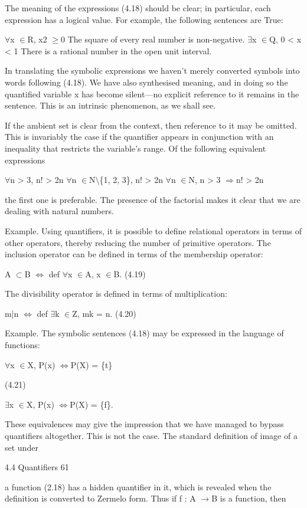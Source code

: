 \documentclass[11pt]{article}
\theoremstyle{plain}
\theoremstyle{definition}
\begin{document}
The meaning of the expressions (4.18) should be clear; in particular, each expression has a logical value. For example, the following sentences are True:

$\forall$x $\in$R, x2 $\geq$0 The square of every real number is non-negative. $\exists$x $\in$Q, 0 < x < 1 There is a rational number in the open unit interval.

In translating the symbolic expressions we haven't merely converted symbols into words following (4.18). We have also synthesised meaning, and in doing so the quantified variable x has become silent---no explicit reference to it remains in the sentence. This is an intrinsic phenomenon, as we shall see.

If the ambient set is clear from the context, then reference to it may be omitted. This is invariably the case if the quantifier appears in conjunction with an inequality that restricts the variable's range. Of the following equivalent expressions

$\forall$n > 3, n! > 2n $\forall$n $\in$N$\setminus$\{1, 2, 3\}, n! > 2n $\forall$n $\in$N, n > 3 $\Rightarrow$n! > 2n

the first one is preferable. The presence of the factorial makes it clear that we are dealing with natural numbers.

Example. Using quantifiers, it is possible to define relational operators in terms of other operators, thereby reducing the number of primitive operators. The inclusion operator can be defined in terms of the membership operator:

A $\subset$B $\Leftrightarrow$ def $\forall$x $\in$A, x $\in$B. (4.19)

The divisibility operator is defined in terms of multiplication:

m|n $\Leftrightarrow$ def $\exists$k $\in$Z, mk = n. (4.20)

Example. The symbolic sentences (4.18) may be expressed in the language of functions:

$\forall$x $\in$X, P(x) $\Leftrightarrow$P(X) = \{t\}

(4.21)

$\exists$x $\in$X, P(x) $\Leftrightarrow$P(X) = \{f\}.

These equivalences may give the impression that we have managed to bypass quantifiers altogether. This is not the case. The standard definition of image of a set under

4.4 Quantifiers 61

a function (2.18) has a hidden quantifier in it, which is revealed when the definition is converted to Zermelo form. Thus if f : A $\to$B is a function, then
\end{document}
